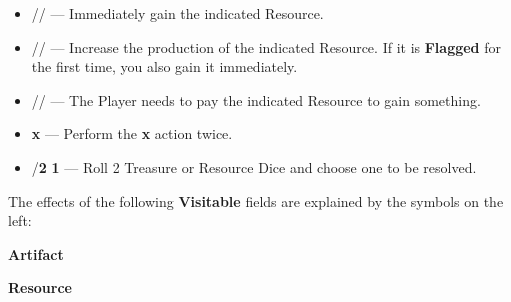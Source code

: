 \begin{multicols*}{2}
\begin{itemize}[itemsep=1em]
  \item [{\LARGE\textbf{+}}]
    // —
    Immediately gain the indicated Resource.
  \item [{}]
    // —
    Increase the production of the indicated Resource.
    If it is \textbf{Flagged} for the first time, you also gain it immediately.
  \item [{}]
    //  —
    The Player needs to pay the indicated Resource to gain something.
  \item [{\LARGE\textbf{2}}] {\LARGE\textbf{x}} —
    Perform the {\LARGE\textbf{x}} action twice.
  \item [{\LARGE\textbf{2}}] /{\LARGE\textbf{2}}  {\LARGE\textbf{1}} —
    Roll 2 Treasure or Resource Dice and choose one to be resolved.
\end{itemize}

\phantom{}
\vspace*{\fill}
\columnbreak

The effects of the following \textbf{Visitable} \hypertarget{All Map Locations}{fields} are explained by the symbols on the left:

\medskip

{\centering
  \phantom{j}\textbf{Artifact}\\

  \bigskip

  \phantom{j}\textbf{Resource}\\
  \\

}
\end{multicols*}
